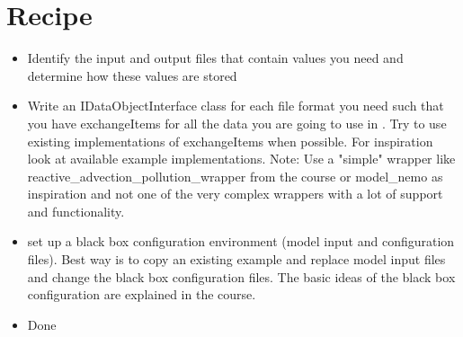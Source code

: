 \section{Recipe}
\begin{itemize}
\item Identify the input and output files that contain values you need and
  determine how these values are stored
\item Write an IDataObjectInterface class for each file format you need such that
  you have exchangeItems for all the data you are going to use in \oda. Try to
  use existing implementations of exchangeItems when possible. For inspiration
  look at available example implementations. Note: Use a "simple" wrapper like
  reactive\_advection\_pollution\_wrapper from the \oda course or model\_nemo
  as inspiration and not one of the very complex wrappers with a lot of support
  and functionality.
\item set up a black box configuration environment (model input and
  configuration files). Best way is to copy an existing example and replace
  model input files and change the black box configuration files. The basic
  ideas of the black box configuration are explained in the \oda course.
\item Done
\end{itemize}





